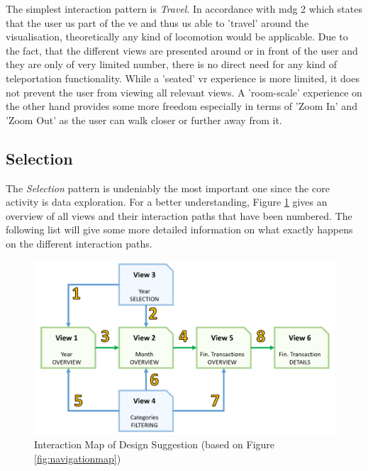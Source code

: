 The simplest interaction pattern is \textit{Travel}. In accordance with \gls{mdg} 2 which states that the user us part of the \gls{ve} and thus us able to 'travel' around the visualisation, theoretically any kind of locomotion would be applicable. Due to the fact, that the different views are presented around or in front of the user and they are only of very limited number, there is no direct need for any kind of teleportation functionality. While a 'seated' \gls{vr} experience is more limited, it does not prevent the user from viewing all relevant views. A 'room-scale' experience on the other hand provides some more freedom especially in terms of 'Zoom In' and 'Zoom Out' as the user can walk closer or further away from it.



\subsection{Selection}

The \textit{Selection} pattern is undeniably the most important one since the core activity is data exploration. For a better understanding, Figure \ref{fig:interactionmap} gives an overview of all views and their interaction paths that have been numbered. The following list will give some more detailed information on what exactly happens on the different interaction paths.
\begin{figure}[h]
	\begin{center}
		\includegraphics[width=14cm]{03_Figures/07_Suggestion/InteractionMap.png}
		\caption[Interaction Map of Design Suggestion]{Interaction Map of Design Suggestion (based on Figure \ref{fig:navigationmap})}
		\label{fig:interactionmap}
	\end{center}
\end{figure}

